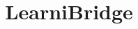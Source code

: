 

\title[LearniBridge \textperiodcentered{} Huang, Chen, Shen \& Zhang \textperiodcentered{} ICML 2026 \textperiodcentered{} independent explainer]{LearniBridge}
